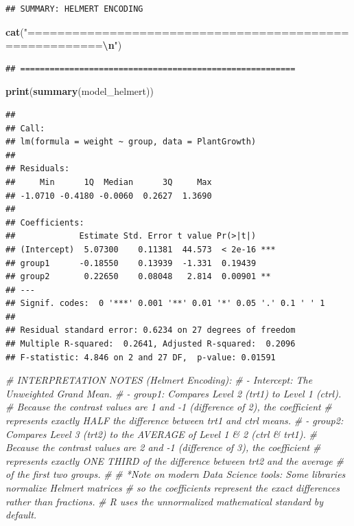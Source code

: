 \documentclass[
]{article}
\newenvironment{Shaded}{\begin{snugshade}}{\end{snugshade}}
\newcommand{\CommentTok}[1]{\textcolor[rgb]{0.56,0.35,0.01}{\textit{#1}}}
\newcommand{\FunctionTok}[1]{\textcolor[rgb]{0.13,0.29,0.53}{\textbf{#1}}}
\newcommand{\NormalTok}[1]{#1}
\newcommand{\SpecialCharTok}[1]{\textcolor[rgb]{0.81,0.36,0.00}{\textbf{#1}}}
\newcommand{\StringTok}[1]{\textcolor[rgb]{0.31,0.60,0.02}{#1}}
\begin{document}
\begin{verbatim}
## SUMMARY: HELMERT ENCODING
\end{verbatim}

\begin{Shaded}
\begin{Highlighting}[]
\FunctionTok{cat}\NormalTok{(}\StringTok{"========================================================}\SpecialCharTok{\textbackslash{}n}\StringTok{"}\NormalTok{)}
\end{Highlighting}
\end{Shaded}

\begin{verbatim}
## ========================================================
\end{verbatim}

\begin{Shaded}
\begin{Highlighting}[]
\FunctionTok{print}\NormalTok{(}\FunctionTok{summary}\NormalTok{(model\_helmert))}
\end{Highlighting}
\end{Shaded}

\begin{verbatim}
## 
## Call:
## lm(formula = weight ~ group, data = PlantGrowth)
## 
## Residuals:
##     Min      1Q  Median      3Q     Max 
## -1.0710 -0.4180 -0.0060  0.2627  1.3690 
## 
## Coefficients:
##             Estimate Std. Error t value Pr(>|t|)    
## (Intercept)  5.07300    0.11381  44.573  < 2e-16 ***
## group1      -0.18550    0.13939  -1.331  0.19439    
## group2       0.22650    0.08048   2.814  0.00901 ** 
## ---
## Signif. codes:  0 '***' 0.001 '**' 0.01 '*' 0.05 '.' 0.1 ' ' 1
## 
## Residual standard error: 0.6234 on 27 degrees of freedom
## Multiple R-squared:  0.2641, Adjusted R-squared:  0.2096 
## F-statistic: 4.846 on 2 and 27 DF,  p-value: 0.01591
\end{verbatim}

\begin{Shaded}
\begin{Highlighting}[]
\CommentTok{\# INTERPRETATION NOTES (Helmert Encoding):}
\CommentTok{\# {-} Intercept: The Unweighted Grand Mean.}
\CommentTok{\# {-} group1: Compares Level 2 (trt1) to Level 1 (ctrl). }
\CommentTok{\#   Because the contrast values are 1 and {-}1 (difference of 2), the coefficient }
\CommentTok{\#   represents exactly HALF the difference between trt1 and ctrl means.}
\CommentTok{\# {-} group2: Compares Level 3 (trt2) to the AVERAGE of Level 1 \& 2 (ctrl \& trt1).}
\CommentTok{\#   Because the contrast values are 2 and {-}1 (difference of 3), the coefficient }
\CommentTok{\#   represents exactly ONE THIRD of the difference between trt2 and the average }
\CommentTok{\#   of the first two groups.}
\CommentTok{\#}
\CommentTok{\# *Note on modern Data Science tools: Some libraries normalize Helmert matrices }
\CommentTok{\# so the coefficients represent the exact differences rather than fractions. }
\CommentTok{\# R uses the unnormalized mathematical standard by default.}
\end{Highlighting}
\end{Shaded}
\end{document}
